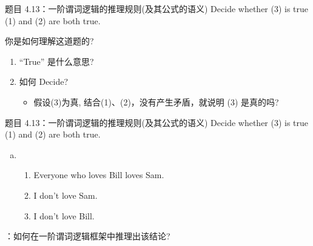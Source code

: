 \begin{frame}{}
  \begin{exampleblock}{题目 4.13：一阶谓词逻辑的推理规则(及其公式的语义)}
    Decide whether (3) is true  (1) and (2) are both true.
  \end{exampleblock}

  \pause
  \vspace{0.50cm}
  你是如何理解这道题的?
  
  \begin{enumerate}
    \item ``True'' 是什么意思?
    \item 如何 Decide?
      \begin{itemize}
	\item 假设(3)为真, 结合(1)、(2)，没有产生矛盾，就说明 (3) 是真的吗?
      \end{itemize}
  \end{enumerate}
\end{frame}

\begin{frame}{}
  \begin{exampleblock}{题目 4.13：一阶谓词逻辑的推理规则(及其公式的语义)}
    Decide whether (3) is true  (1) and (2) are both true.

    \begin{enumerate}[(a)]
      \item 
	\begin{enumerate}[(1)]
	  \item Everyone who loves Bill loves Sam.
	  \item I don't love Sam.
	  \item I don't love Bill.
	\end{enumerate}
    \end{enumerate}
  \end{exampleblock}

  \vspace{0.50cm}
  \pause
  \centerline{：如何在一阶谓词逻辑框架中推理出该结论?}
\end{frame}

